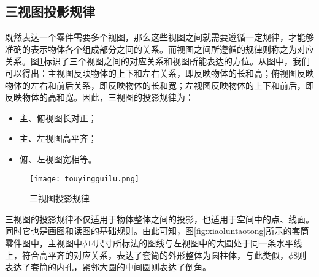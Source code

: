 \subsection{三视图投影规律}
既然表达一个零件需要多个视图，那么这些视图之间就需要遵循一定规律，才能够准确的表示物体各个组成部分之间的关系。而视图之间所遵循的规律则称之为对应关系。图\ref{fig:threeviewguanxi}标识了三个视图之间的对应关系和视图所能表达的方位。从图中，我们可以得出：主视图反映物体的上下和左右关系，即反映物体的长和高；俯视图反映物体的左右和前后关系，即反映物体的长和宽；左视图反映物体的上下和前后，即反映物体的高和宽。因此，三视图的投影规律为：
\begin{itemize}
\item 主、俯视图长对正；
\item 主、左视图高平齐；
\item 俯、左视图宽相等。
\end{itemize}
\begin{figure}[htbp]
\texttt{[image: touyingguilu.png]}
\caption{三视图投影规律}\label{fig:threeviewguanxi}
\end{figure}
三视图的投影规律不仅适用于物体整体之间的投影，也适用于空间中的点、线面。同时它也是画图和读图的基础规则。由此可知，图\ref{fig:xiaoluntaotong}所示的套筒零件图中，主视图中$\phi 14$尺寸所标法的图线与左视图中的大圆处于同一条水平线上，符合高平齐的对应关系，表达了套筒的外形整体为圆柱体，与此类似，$\phi 8$则表达了套筒的内孔，紧邻大圆的中间圆则表达了倒角。

\endinput